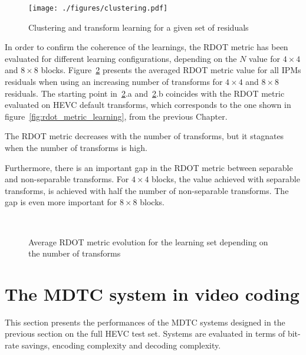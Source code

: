 \documentclass[11pt,a4paper,openright,twoside]{book}
\numberwithin{equation}{section} %
\numberwithin{figure}{section} %
\numberwithin{table}{section} %
\begin{document}
\begin{figure}[tp]
	\centering
	\texttt{[image: ./figures/clustering.pdf]}
	\caption{Clustering and transform learning for a given set of residuals}
	\label{fig:clustering}
\end{figure}

In order to confirm the coherence of the learnings, the \ac{RDOT} metric has
been evaluated for different learning configurations, depending on the $N$
value for $4\times4$ and $8\times8$ blocks.
Figure~\ref{fig:mdtc_rdot_metric_ntransforms} presents the averaged \ac{RDOT}
metric value for all \acp{IPM} residuals when using an increasing number of
transforms for $4\times4$ and $8\times8$ residuals.
The starting point in~\ref{fig:mdtc_rdot_metric_ntransforms}.a
and~\ref{fig:mdtc_rdot_metric_ntransforms}.b coincides with the \ac{RDOT}
metric evaluated on \ac{HEVC} default transforms, which corresponds to the one
shown in figure~\ref{fig:rdot_metric_learning}, from the previous Chapter.

The \ac{RDOT} metric decreases with the number of transforms, but it stagnates
when the number of transforms is high.

Furthermore, there is an important gap in the \ac{RDOT} metric between
separable and non-separable transforms.
For $4\times4$ blocks, the value achieved with separable transforms, is
achieved with half the number of non-separable transforms.
The gap is even more important for $8\times8$ blocks.

\begin{figure}[tb]
	\centering
	\\
	\caption[\acs{RDOT} metric for different separable and non-separable
	transform learnings]
	{Average \acs{RDOT} metric evolution for the learning set depending
	on the number of transforms}
	\label{fig:mdtc_rdot_metric_ntransforms}
\end{figure}

\section{The \acs{MDTC} system in video coding}
\label{sec:performances_of_the_mdtc_system}

This section presents the performances of the \ac{MDTC} systems designed in
the previous section on the full \ac{HEVC} test set.
Systems are evaluated in terms of bit-rate savings, encoding complexity and
decoding complexity.
\end{document}
